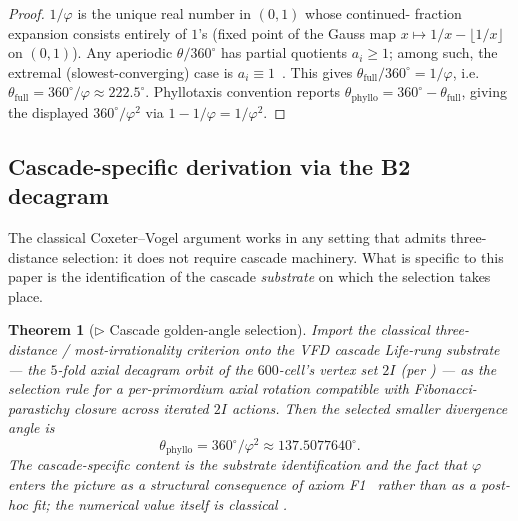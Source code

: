 \documentclass[12pt]{article}
\newtheorem{theorem}{Theorem}
\newcommand{\phig}{\varphi}
\begin{document}
\begin{proof}
$1/\phig$ is the unique real number in $(0, 1)$ whose continued-
fraction expansion consists entirely of $1$'s (fixed point of the
Gauss map $x \mapsto 1/x - \lfloor 1/x \rfloor$ on $(0, 1)$). Any
aperiodic $\theta/360^{\circ}$ has partial quotients $a_i \ge 1$;
among such, the extremal (slowest-converging) case is
$a_i \equiv 1$~\cite{Coxeter1953,Vogel1979}. This gives
$\theta_{\mathrm{full}}/360^{\circ} = 1/\phig$, i.e.
$\theta_{\mathrm{full}} = 360^{\circ}/\phig \approx 222.5^{\circ}$.
Phyllotaxis convention reports $\theta_{\mathrm{phyllo}} =
360^{\circ} - \theta_{\mathrm{full}}$, giving the displayed
$360^{\circ}/\phig^2$ via $1 - 1/\phig = 1/\phig^2$.
\end{proof}

\subsection{Cascade-specific derivation via the B2 decagram}

The classical Coxeter--Vogel argument works in any setting that
admits three-distance selection: it does not require cascade
machinery. What is specific to this paper is the identification of
the cascade \emph{substrate} on which the selection takes place.

\begin{theorem}[$\triangleright$ Cascade golden-angle selection]\label{thm:T1}
\emph{Import the classical three-distance / most-irrationality
criterion onto the VFD cascade Life-rung substrate} --- the
$5$-fold axial decagram orbit of the $600$-cell's vertex set $2I$
(per \cite[\S 5.1]{CascadeBio}) --- as the selection rule for a
per-primordium axial rotation compatible with Fibonacci-parastichy
closure across iterated $2I$ actions. Then the selected smaller
divergence angle is
\[
    \theta_{\mathrm{phyllo}} = 360^{\circ}/\phig^2
    \approx 137.5077640^{\circ}.
\]
The cascade-specific content is the substrate identification and
the fact that $\phig$ enters the picture as a structural
consequence of axiom F1~\cite[\S F1]{CascadeFoundations} rather
than as a post-hoc fit; the numerical value itself is classical
\cite{Coxeter1953,Vogel1979}.
\end{theorem}
\end{document}

